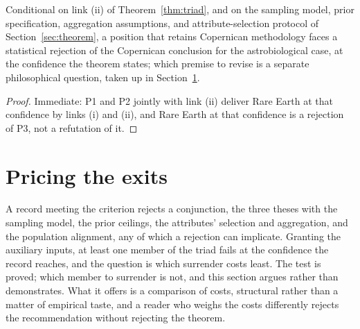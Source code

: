 \begin{corollary}
\label{cor:method}
Conditional on link (ii) of Theorem~\ref{thm:triad}, and on the sampling model, prior specification, aggregation assumptions, and attribute-selection protocol of Section~\ref{sec:theorem}, a position that retains Copernican methodology faces a statistical rejection of the Copernican conclusion for the astrobiological case, at the confidence the theorem states; which premise to revise is a separate philosophical question, taken up in Section~\ref{sec:exits}.
\end{corollary}

\begin{proof}
Immediate: P1 and P2 jointly with link (ii) deliver Rare Earth at that confidence by links (i) and (ii), and Rare Earth at that confidence is a rejection of P3, not a refutation of it.
\end{proof}

\section{Pricing the exits}
\label{sec:exits}

A record meeting the criterion rejects a conjunction, the three theses with the sampling model, the prior ceilings, the attributes' selection and aggregation, and the population alignment, any of which a rejection can implicate. Granting the auxiliary inputs, at least one member of the triad fails at the confidence the record reaches, and the question is which surrender costs least. The test is proved; which member to surrender is not, and this section argues rather than demonstrates. What it offers is a comparison of costs, structural rather than a matter of empirical taste, and a reader who weighs the costs differently rejects the recommendation without rejecting the theorem.

